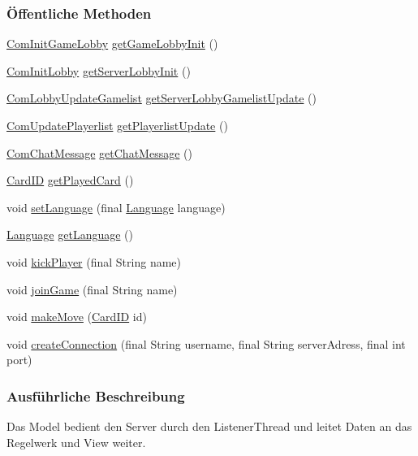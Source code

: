 \subsubsection*{Öffentliche Methoden}
\begin{DoxyCompactItemize}
\item 
\hyperlink{a00023}{Com\-Init\-Game\-Lobby} \hyperlink{a00013_a35476459f18487356f614c194a0f0a3e}{get\-Game\-Lobby\-Init} ()
\item 
\hyperlink{a00024}{Com\-Init\-Lobby} \hyperlink{a00013_a01e99796149434a311e1a2dd2ed57314}{get\-Server\-Lobby\-Init} ()
\item 
\hyperlink{a00027}{Com\-Lobby\-Update\-Gamelist} \hyperlink{a00013_ab314b846413ebad25fbc5ee0e89d9445}{get\-Server\-Lobby\-Gamelist\-Update} ()
\item 
\hyperlink{a00033}{Com\-Update\-Playerlist} \hyperlink{a00013_ab26f2c07556d4d9ddc74fddd3daad96d}{get\-Playerlist\-Update} ()
\item 
\hyperlink{a00019}{Com\-Chat\-Message} \hyperlink{a00013_ab01edcf46c3e240c5f36786e6459416e}{get\-Chat\-Message} ()
\item 
\hyperlink{a00005}{Card\-I\-D} \hyperlink{a00013_af8e8f554274458f916b5474f6f0b3a49}{get\-Played\-Card} ()
\item 
void \hyperlink{a00013_adf1f7819be59c43089611c4c9743308f}{set\-Language} (final \hyperlink{a00052}{Language} language)
\item 
\hyperlink{a00052}{Language} \hyperlink{a00013_a4fbbd91f3ce02f00ec1e00ee75a794b9}{get\-Language} ()
\item 
void \hyperlink{a00013_a3eccc4b5010311983355bb656f320397}{kick\-Player} (final String name)
\item 
void \hyperlink{a00013_a522b10a6dc6395519601d16036515740}{join\-Game} (final String name)
\item 
void \hyperlink{a00013_a07940a8aa4d3af05a2ca60a5e6ca482d}{make\-Move} (\hyperlink{a00005}{Card\-I\-D} id)
\item 
void \hyperlink{a00013_ae42c1c11992b0efcbc6ed833463e18ab}{create\-Connection} (final String username, final String server\-Adress, final int port)
\end{DoxyCompactItemize}


\subsubsection{Ausführliche Beschreibung}
Das Model bedient den Server durch den Listener\-Thread und leitet Daten an das Regelwerk und View weiter. 

